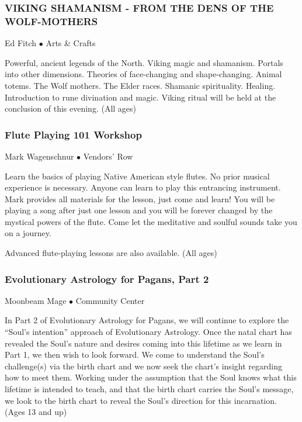 \subsubsection{VIKING SHAMANISM - FROM THE DENS OF THE WOLF-MOTHERS}
\label{Sat-Fitch1}
{\small Ed Fitch $\bullet$  Arts \& Crafts}

 Powerful, ancient legends of the North.  Viking magic and shamanism.  Portals into other dimensions.  Theories of face-changing and shape-changing.  Animal totems.  The Wolf mothers. The Elder races.  Shamanic spirituality.  Healing.  Introduction to rune divination and magic.  Viking ritual will be held at the conclusion of this evening. {\small (All ages)}

\subsubsection{Flute Playing 101 Workshop}
\label{Sat-Mark2}
{\small Mark Wagenschnur $\bullet$  Vendors' Row}

 Learn the basics of playing Native American style flutes.  No prior musical experience is necessary.  Anyone can learn to play this entrancing instrument.  Mark provides all materials for the lesson, just come and learn!   You will be playing a song after just one lesson and you will be forever changed by the mystical powers of the flute.  Come let the meditative and soulful sounds take you on a journey.

Advanced flute-playing lessons are also available. {\small (All ages)}

\subsubsection{Evolutionary Astrology for Pagans, Part 2}
\label{Sat-Mage3}
{\small Moonbeam Mage $\bullet$  Community Center}

 In Part 2 of Evolutionary Astrology for Pagans, we will continue to explore the  ``Soul's intention''  approach of Evolutionary Astrology. Once the natal chart has revealed the Soul's nature and desires coming into this lifetime as we learn in Part 1, we then wish to look forward. We come to understand the Soul's challenge(s) via the birth chart and we now seek the chart's insight regarding how to meet them. Working under the assumption that the Soul knows what this lifetime is intended to teach, and that the birth chart carries the Soul's message, we look to the birth chart to reveal the Soul's direction for this incarnation.   {\small (Ages 13 and up)}

